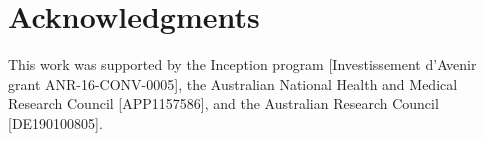 \documentclass[10pt,letterpaper]{article}
\begin{document}
\section*{Acknowledgments}
This work was supported by the Inception program [Investissement d’Avenir grant ANR-16-CONV-0005], the Australian National Health and Medical Research Council [APP1157586], and the Australian Research Council [DE190100805].

\nolinenumbers

%
%
% 





\end{document}
